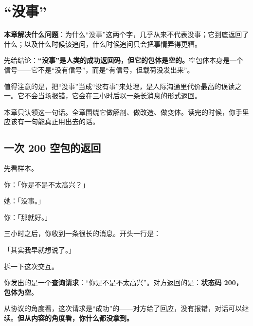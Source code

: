 \chapter{“没事”}


\begin{guideblock}
\textbf{本章解决什么问题}：为什么“没事”这两个字，几乎从来不代表没事；它到底返回了什么；以及什么时候该追问，什么时候追问只会把事情弄得更糟。
\end{guideblock}

先给结论：\textbf{“没事”是人类的成功返回码，但它的包体是空的。}空包体本身是一个信号——它不是“没有信号”，而是“有信号，但载荷没发出来”。

值得注意的是，把“没事”当成“没有事”来处理，是人际沟通里代价最高的误读之一。它不会当场报错，它会在三小时后以一条长消息的形式返回。

本章只认领这一句话。全章围绕它做解剖、做改造、做变体。读完的时候，你手里应该有一句能真正用出去的话。

\hcirule

\section{一次 200 空包的返回}

先看样本。

\par
\begin{mdquote}
你：「你是不是不太高兴？」\par
她：「没事。」\par
你：「那就好。」\par
\vspace{0.3\baselineskip}
三小时之后，你收到一条很长的消息。开头一行是：\par
\vspace{0.3\baselineskip}
「其实我早就想说了。」
\end{mdquote}

拆一下这次交互。

你发出的是一个\textbf{查询请求}：“你是不是不太高兴”。对方返回的是：\textbf{状态码 200，包体为空}。

从协议的角度看，这次请求是“成功”的——对方给了回应，没有报错，对话可以继续。\textbf{但从内容的角度看，你什么都没拿到。}

